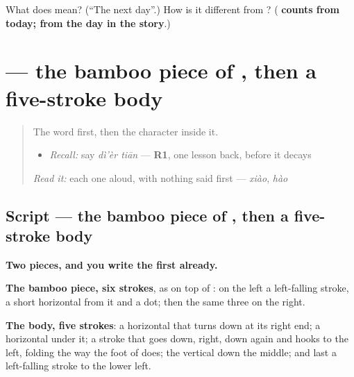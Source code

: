 \begin{tcolorbox}[breakable,colback=teal!4,colframe=teal!35!black,title={Before you move on}]
What does  mean? (\textquotedblleft{}The next day\textquotedblright{}.) How is it different from ? (\textbf{ counts from today;  from the day in the story}.)
\end{tcolorbox}
\section[\texorpdfstring{\zh{第} (dì)}{第 (dì)}]{ — the bamboo piece of , then a five-stroke body}

\label{lesson:ZH-W279-di}



\begin{quote}
The word first, then the character inside it.

\begin{itemize}
\raggedright
  \item \emph{Recall:} say \emph{dì'èr tiān} — \textbf{R1}, one lesson back, before it decays
\end{itemize}

\begin{quote}
 
\end{quote}

\emph{Read it:} each one aloud, with nothing said first — \emph{xiào}, \emph{hào}
\end{quote}

\subsection*{Script — the bamboo piece of , then a five-stroke body}

\begin{quote}
\end{quote}

\textbf{Two pieces, and you write the first already.}

\textbf{The bamboo piece, six strokes}, as on top of : on the left a left-falling stroke, a short horizontal from it and a dot; then the same three on the right.

\textbf{The body, five strokes}: a horizontal that turns down at its right end; a horizontal under it; a stroke that goes down, right, down again and hooks to the left, folding the way the foot of  does; the vertical down the middle; and last a left-falling stroke to the lower left.

